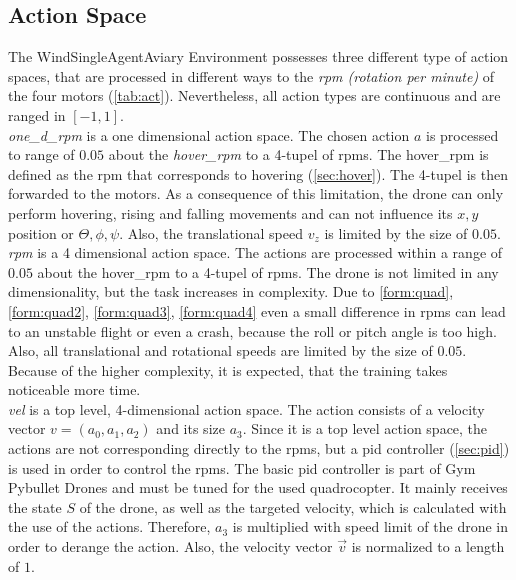 \subsection{Action Space}
The WindSingleAgentAviary Environment possesses three different type of action spaces, 
that are processed in different ways to the \emph{rpm (rotation per minute)} of the four motors (\cref{tab:act}). 
Nevertheless, all action types are continuous and are ranged in $[-1, 1]$.\\
\newline
\emph{one\_d\_rpm} is a one dimensional action space. 
The chosen action $a$ is processed to range of $0.05$ about the \emph{hover\_rpm} to a 4-tupel of rpms. 
The hover\_rpm is defined as the rpm that corresponds to hovering (\cref{sec:hover}). 
The 4-tupel is then forwarded to the motors. 
As a consequence of this limitation, the drone can only perform hovering, 
rising and falling movements and can not influence its $x,y$ position or $\Theta, \phi, \psi$. 
Also, the translational speed $v_z$ is limited by the size of $0.05$.\\
\newline
\emph{rpm} is a 4 dimensional action space. The actions are processed within a range of $0.05$ about the hover\_rpm to a 4-tupel of rpms. 
The drone is not limited in any dimensionality, but the task increases in complexity. 
Due to \cref{form:quad}, \cref{form:quad2}, \cref{form:quad3}, \cref{form:quad4} even a small difference in rpms can lead to an unstable flight
 or even a crash, because the roll or pitch angle is too high. 
 Also, all translational and rotational speeds are limited by the size of $0.05$. 
 Because of the higher complexity, it is expected, that the training takes noticeable more time.\\
\newline
\emph{vel} is a top level, 4-dimensional action space. The action consists of a velocity vector $v = (a_0, a_1, a_2)$ and its size $a_3$. 
Since it is a top level action space, the actions are not corresponding directly to the rpms, but a pid controller (\cref{sec:pid}) is used in order to control the rpms. 
The basic pid controller is part of Gym Pybullet Drones \cite{panerati2021learning} and must be tuned for the used quadrocopter. 
It mainly receives the state $S$ of the drone, as well as the targeted velocity, which is calculated with the use of the actions. 
Therefore, $a_3$ is multiplied with speed limit of the drone in order to derange the action. 
Also, the velocity vector $\overrightarrow{v}$ is normalized to a length of $1$.\\
